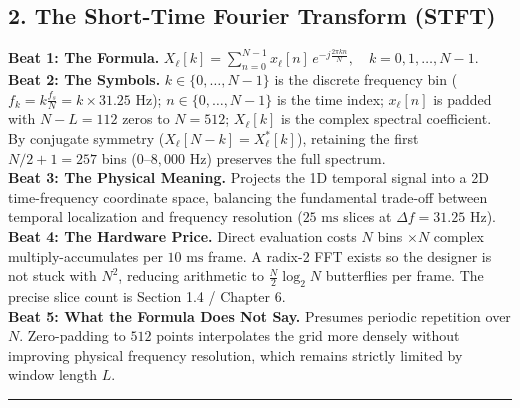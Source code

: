 \documentclass[11pt,a4paper]{article}
\begin{document}
\clearpage

\vspace*{-4.5mm}
\subsection*{2. The Short-Time Fourier Transform (STFT)}
\vspace{-2.5mm}
{\small
\textbf{Beat 1: The Formula.} $X_\ell[k] = \sum_{n=0}^{N-1} x_\ell[n] \, e^{-j \frac{2\pi k n}{N}}, \quad k = 0, 1, \dots, N-1$.\\[0.8mm]
\textbf{Beat 2: The Symbols.} $k \in \{0, \dots, N-1\}$ is the discrete frequency bin ($f_k = k \frac{f_s}{N} = k \times 31.25\text{ Hz}$); $n \in \{0, \dots, N-1\}$ is the time index; $x_\ell[n]$ is padded with $N - L = 112$ zeros to $N = 512$; $X_\ell[k]$ is the complex spectral coefficient. By conjugate symmetry ($X_\ell[N-k] = X_\ell^*[k]$), retaining the first $N/2 + 1 = 257$ bins ($0\text{--}8{,}000\text{ Hz}$) preserves the full spectrum.\\[0.8mm]
\textbf{Beat 3: The Physical Meaning.} Projects the 1D temporal signal into a 2D time-frequency coordinate space, balancing the fundamental trade-off between temporal localization and frequency resolution ($25\text{ ms}$ slices at $\Delta f = 31.25\text{ Hz}$).\\[0.8mm]
\textbf{Beat 4: The Hardware Price.} Direct evaluation costs $N$ bins $\times N$ complex multiply-accumulates per $10\text{ ms}$ frame. A radix-2 FFT exists so the designer is not stuck with $N^2$, reducing arithmetic to $\frac{N}{2} \log_2 N$ butterflies per frame. The precise slice count is Section 1.4 / Chapter 6.\\[0.8mm]
\textbf{Beat 5: What the Formula Does Not Say.} Presumes periodic repetition over $N$. Zero-padding to $512$ points interpolates the grid more densely without improving physical frequency resolution, which remains strictly limited by window length $L$.
}

\vspace{1.5mm}
\hrule
\vspace{1.5mm}
\end{document}
